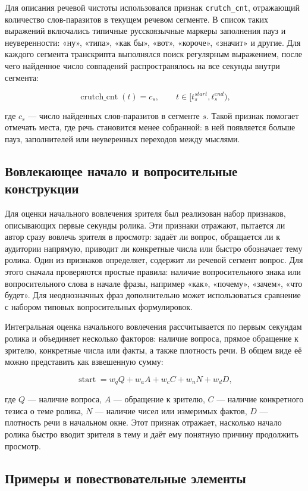 \documentclass[times]{itmo-student-thesis}
\begin{document}
Для описания речевой чистоты использовался признак \texttt{crutch\_cnt}, отражающий количество слов-паразитов в текущем речевом сегменте. В список таких выражений включались типичные русскоязычные маркеры заполнения пауз и неуверенности: «ну», «типа», «как бы», «вот», «короче», «значит» и другие. Для каждого сегмента транскрипта выполнялся поиск регулярным выражением, после чего найденное число совпадений распространялось на все секунды внутри сегмента:

\[
\operatorname{crutch\_cnt}(t)=c_s,\qquad t\in[t_s^{start},t_s^{end}),
\]

где $c_s$ — число найденных слов-паразитов в сегменте $s$. Такой признак помогает отмечать места, где речь становится менее собранной: в ней появляется больше пауз, заполнителей или неуверенных переходов между мыслями.

\subsection{Вовлекающее начало и вопросительные конструкции}

Для оценки начального вовлечения зрителя был реализован набор признаков, описывающих первые секунды ролика. Эти признаки отражают, пытается ли автор сразу вовлечь зрителя в просмотр: задаёт ли вопрос, обращается ли к аудитории напрямую, приводит ли конкретные числа или быстро обозначает тему ролика. Один из признаков определяет, содержит ли речевой сегмент вопрос. Для этого сначала проверяются простые правила: наличие вопросительного знака или вопросительного слова в начале фразы, например «как», «почему», «зачем», «что будет». Для неоднозначных фраз дополнительно может использоваться сравнение с набором типовых вопросительных формулировок.

Интегральная оценка начального вовлечения рассчитывается по первым секундам ролика и объединяет несколько факторов: наличие вопроса, прямое обращение к зрителю, конкретные числа или факты, а также плотность речи. В общем виде её можно представить как взвешенную сумму:

\[
\operatorname{start}=w_q Q + w_a A + w_c C + w_n N + w_d D,
\]

где $Q$ — наличие вопроса, $A$ — обращение к зрителю, $C$ — наличие конкретного тезиса о теме ролика, $N$ — наличие чисел или измеримых фактов, $D$ — плотность речи в начальном окне. Этот признак отражает, насколько начало ролика быстро вводит зрителя в тему и даёт ему понятную причину продолжить просмотр.

\subsection{Примеры и повествовательные элементы}
\end{document}
